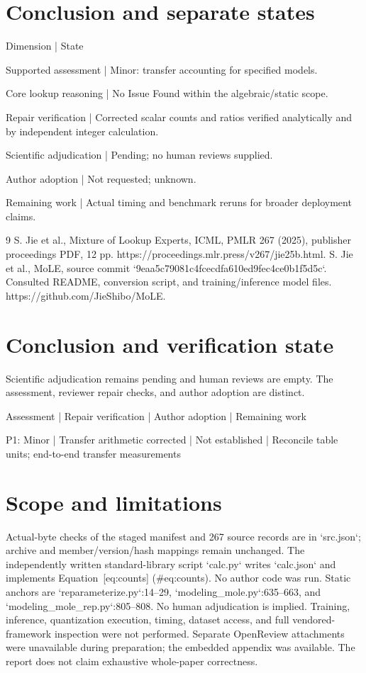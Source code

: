 \documentclass[10pt]{article}
\begin{document}
\section*{Conclusion and separate states}
Dimension | State\par
Supported assessment | Minor: transfer accounting for specified models.\par
Core lookup reasoning | No Issue Found within the algebraic/static scope.\par
Repair verification | Corrected scalar counts and ratios verified analytically and by independent integer calculation.\par
Scientific adjudication | Pending; no human reviews supplied.\par
Author adoption | Not requested; unknown.\par
Remaining work | Actual timing and benchmark reruns for broader deployment claims.\par
9 S. Jie et al., Mixture of Lookup Experts, ICML, PMLR 267 (2025), publisher proceedings PDF, 12 pp. https://proceedings.mlr.press/v267/jie25b.html. S. Jie et al., MoLE, source commit `9eaa5c79081c4fcecdfa610ed9fec4ce0b1f5d5c`. Consulted README, conversion script, and training/inference model files. https://github.com/JieShibo/MoLE.\par
\section*{Conclusion and verification state}
Scientific adjudication remains pending and human reviews are empty. The assessment, reviewer repair checks, and author adoption are distinct.\par
Assessment | Repair verification | Author adoption | Remaining work\par
P1: Minor | Transfer arithmetic corrected | Not established | Reconcile table units; end-to-end transfer measurements\par
\section*{Scope and limitations}
Actual-byte checks of the staged manifest and 267 source records are in `src.json`; archive and member/version/hash mappings remain unchanged. The independently written standard-library script `calc.py` writes `calc.json` and implements Equation [eq:counts] (\#eq:counts). No author code was run. Static anchors are `reparameterize.py`:14–29, `modeling\_mole.py`:635–663, and `modeling\_mole\_rep.py`:805–808. No human adjudication is implied. Training, inference, quantization execution, timing, dataset access, and full vendored-framework inspection were not performed. Separate OpenReview attachments were unavailable during preparation; the embedded appendix was available. The report does not claim exhaustive whole-paper correctness.\par
\end{document}
